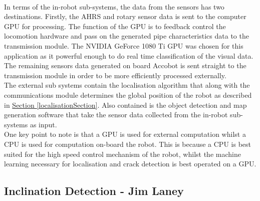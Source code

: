 \documentclass[11pt]{article}		%
\newcommand{\sectref}[1]{\hyperref[#1]{Section \ref*{#1}}}     %
\begin{document}
	        \\
	        \hspace*{2ex}In terms of the in-robot sub-systems, the data from the sensors has two destinations. Firstly, the AHRS and rotary sensor data is sent to the computer GPU for processing. The function of the GPU is to feedback control the locomotion hardware and pass on the generated pipe characteristics data to the transmission module. The NVIDIA GeForce 1080 Ti GPU was chosen for this application as it powerful enough to do real time classification of the visual data.
	         The remaining sensors data generated on board Accobot is sent straight to the transmission module in order to be more efficiently processed externally.
	         \\
	        \hspace*{2ex}The external sub systems contain the localisation algorithm that along with the communications module determines the global position of the robot as described in \sectref{localisationSection}. Also contained is the object detection and map generation software that take the sensor data collected from the in-robot sub-systems as input.
	        \\
	        \hspace*{2ex}One key point to note is that a GPU is used for external computation whilst a CPU is used for computation on-board the robot. This is because a CPU is best suited for the high speed control mechanism of the robot, whilst the machine learning necessary for localisation and crack detection is best operated on a GPU.
	          
		\subsection[Inclination Detection]{Inclination Detection - Jim Laney} \label{poseCalculation}
		
\end{document}
